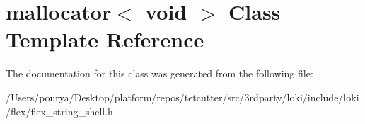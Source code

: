 \hypertarget{classmallocator_3_01void_01_4}{}\section{mallocator$<$ void $>$ Class Template Reference}
\label{classmallocator_3_01void_01_4}


The documentation for this class was generated from the following file\+:\begin{DoxyCompactItemize}
\item 
/\+Users/pourya/\+Desktop/platform/repos/tetcutter/src/3rdparty/loki/include/loki/flex/flex\+\_\+string\+\_\+shell.\+h\end{DoxyCompactItemize}
